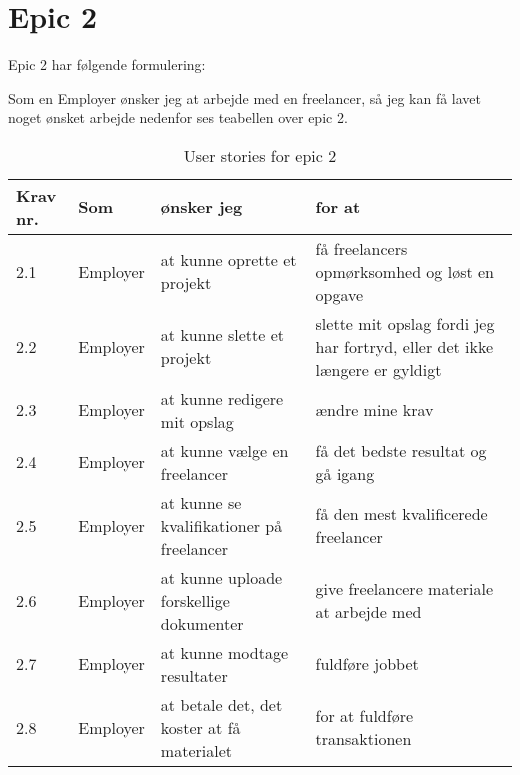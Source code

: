 
\section{Epic 2}
Epic 2 har følgende formulering:

Som en Employer ønsker jeg at arbejde med en freelancer, så jeg kan få lavet noget ønsket arbejde
nedenfor ses teabellen over epic 2.


\begin{table}[H]
    \centering
    \caption{User stories for epic 2}
    \label{tab:us-epic2}
    \begin{tabular}{p{1cm}|p{2cm}|p{6cm}|p{6cm}}
        \textbf{Krav nr.} & \textbf{Som} & \textbf{ønsker jeg}                        & \textbf{for at}                                                                                     \\
        \hline
        2.1               & Employer     & at kunne oprette et projekt                & få freelancers opmørksomhed og løst en opgave                                                       \\
        \hline
        2.2               & Employer     & at kunne slette et projekt                 & \multicolumn{1}{p{6cm}}{slette mit opslag fordi jeg har fortryd, eller det ikke længere er gyldigt} \\
        \hline
        2.3               & Employer     & at kunne redigere mit opslag               & ændre mine krav                                                                                     \\
        \hline
        2.4               & Employer     & at kunne vælge en freelancer               & få det bedste resultat og gå igang                                                                  \\
        \hline
        2.5               & Employer     & at kunne se kvalifikationer på freelancer  & få den mest kvalificerede freelancer                                                                \\
        \hline
        2.6               & Employer     & at kunne uploade forskellige dokumenter    & give freelancere materiale at arbejde med                                                           \\
        \hline
        2.7               & Employer     & at kunne modtage resultater                & fuldføre jobbet                                                                                     \\
        \hline
        2.8               & Employer     & at betale det, det koster at få materialet & for at fuldføre transaktionen                                                                       \\
    \end{tabular}
\end{table}

